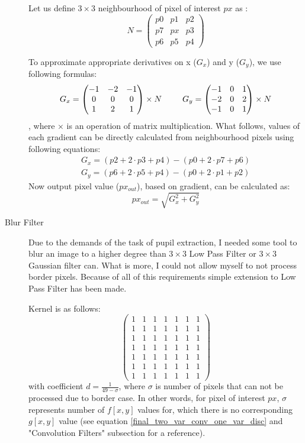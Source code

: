 \documentclass{article}
\begin{document}
\begin{description}
Let us define $3 \times 3$ neighbourhood of pixel of interest $px$ as :
\[
N = 
\begin{pmatrix}
  p0 & p1 & p2 \\
  p7 & px & p3 \\
  p6 & p5 & p4
\end{pmatrix}
\]

To approximate appropriate derivatives on x ($G_x$) and y ($G_y$), we use following formulas:
\[
G_x =
\begin{pmatrix}
  -1 & -2 & -1 \\
   0 & 0 & 0 \\
   1 & 2 & 1
\end{pmatrix}
\times
N
\hskip 2.5em
G_y =
\begin{pmatrix}
  -1 & 0 & 1 \\
   -2 & 0 & 2 \\
   -1 & 0 & 1
\end{pmatrix}
\times
N
\]
, where $\times$ is an operation of matrix multiplication. What follows, values of each gradient can be directly calculated from neighbourhood pixels using following equations:
\[
\begin{split}
G_x = (p2 + 2 \cdot p3 + p4) - (p0 + 2 \cdot p7 + p6) \\
G_y = (p6 + 2 \cdot p5 + p4) - (p0 + 2 \cdot p1 + p2)
\end{split}
\]
Now output pixel value ($px_{out}$), based on gradient, can be calculated as:
\[
px_{out} = \sqrt{G_x^2 + G_y^2}
\]

\pagebreak

\item[Blur Filter]
Due to the demands of the task of pupil extraction, I needed some tool to blur an image to a higher degree than $3 \times 3$ Low Pass Filter or $3 \times 3$ Gaussian filter can. What is more, I could not allow myself to not process border pixels. Because of all of this requirements simple extension to Low Pass Filter has been made.

Kernel is as follows:
\[
\begin{pmatrix}
  1 & 1 & 1 & 1 & 1 & 1 &1 \\
  1 & 1 & 1 & 1 & 1 & 1 &1 \\
  1 & 1 & 1 & 1 & 1 & 1 &1 \\
  1 & 1 & 1 & 1 & 1 & 1 &1 \\
  1 & 1 & 1 & 1 & 1 & 1 &1 \\
  1 & 1 & 1 & 1 & 1 & 1 &1 \\
  1 & 1 & 1 & 1 & 1 & 1 &1 
 \end{pmatrix}
 \]
with coefficient $d = \frac{1}{49 - \sigma}$, where $\sigma$ is number of pixels that can not be processed due to border case. In other words, for pixel of interest $px$, $\sigma$ represents number of $f[x,y]$ values for, which there is no corresponding $g[x,y]$ value (see equation \ref{final_two_var_conv_one_var_disc} and "Convolution Filters" subsection for a reference). 


\end{description}
\end{document}
